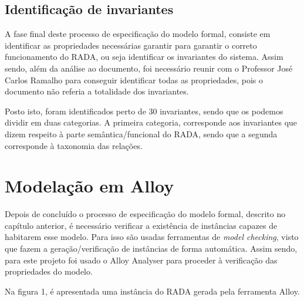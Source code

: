 \documentclass{article}
\begin{document}
\subsection{Identificação de invariantes}

\par A fase final deste processo de especificação do modelo formal, consiste em identificar as propriedades necessárias garantir para garantir o correto funcionamento do RADA, ou seja identificar os invariantes do sistema. Assim sendo, além da análise ao documento, foi necessário reunir com o Professor José Carlos Ramalho para conseguir identificar todas as propriedades, pois o documento não referia a totalidade dos invariantes.
\par Posto isto, foram identificados perto de 30 invariantes, sendo que os podemos dividir em duas categorias. A primeira categoria, corresponde aos invariantes que dizem respeito à parte semântica/funcional do RADA, sendo que a segunda corresponde à taxonomia das relações.

\newpage
\section{Modelação em Alloy}

\par Depois de concluído o processo de especificação do modelo formal, descrito no capítulo anterior, é necessário verificar a existência de instâncias capazes de habitarem esse modelo. Para isso são usadas ferramentas de \emph{model checking}, visto que fazem a geração/verificação de instâncias de forma automática. Assim sendo, para este projeto foi usado o Alloy Analyser para proceder à verificação das propriedades do modelo.
\par Na figura 1, é apresentada uma instância do RADA gerada pela ferramenta Alloy.
\end{document}
